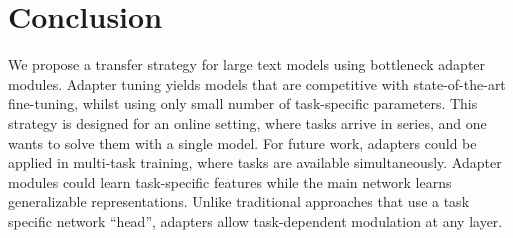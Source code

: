 \section{Conclusion}

We propose a transfer strategy for large text models using bottleneck adapter modules.
Adapter tuning yields models that are competitive with state-of-the-art fine-tuning, whilst using only small number of task-specific parameters.
This strategy is designed for an online setting, where tasks arrive in series, and one wants to solve them with a single model.
For future work, adapters could be applied in multi-task training, where tasks are available simultaneously.
Adapter modules could learn task-specific features while the main network learns generalizable representations.
Unlike traditional approaches that use a task specific network ``head'',
adapters allow task-dependent modulation at any layer.
